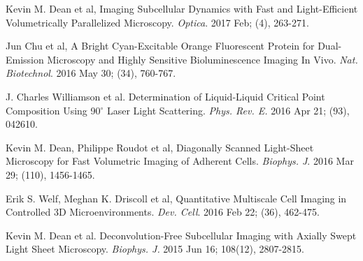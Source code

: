 \begin{etaremune}
\item Kevin M. Dean et al, Imaging Subcellular Dynamics with Fast and Light-Efficient Volumetrically Parallelized Microscopy. {\it Optica}.  2017 Feb; (4), 263-271.

\item Jun Chu et al,  A Bright Cyan-Excitable Orange Fluorescent Protein for Dual-Emission Microscopy and Highly Sensitive Bioluminescence Imaging In Vivo.  {\it Nat. Biotechnol}. 2016 May 30; (34), 760-767.

\item J. Charles Williamson et al.  Determination of Liquid-Liquid Critical Point Composition Using 90$^{\circ}$ Laser Light Scattering. {\it Phys. Rev. E.}  2016 Apr 21; (93), 042610.

\item Kevin M. Dean, Philippe Roudot et al,  Diagonally Scanned Light-Sheet Microscopy for Fast Volumetric Imaging of Adherent Cells.  {\it Biophys. J}.  2016 Mar 29; (110), 1456-1465. 

\item Erik S. Welf, Meghan K. Driscoll et al, Quantitative Multiscale Cell Imaging in Controlled 3D Microenvironments. {\it Dev. Cell}.  2016 Feb 22; (36), 462-475. 

\item Kevin M. Dean et al.  Deconvolution-Free Subcellular Imaging with Axially Swept Light Sheet Microscopy.  {\it Biophys. J.} 2015 Jun 16; 108(12), 2807-2815.


\end{etaremune}
